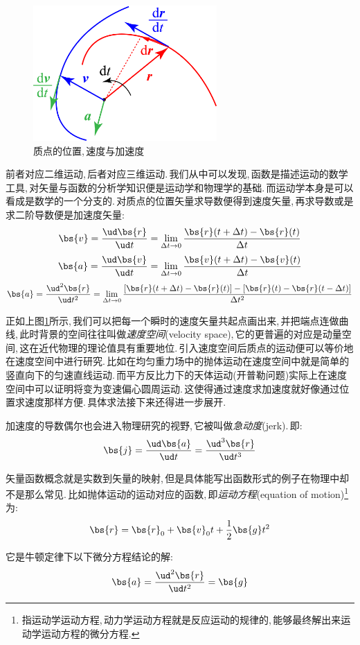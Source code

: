 \begin{figure}\label{6-1-3}
\vspace{-0.4cm}
\centering
\includegraphics[width=7cm]{image/6-1-3.png}
\caption{质点的位置,\,速度与加速度}
\end{figure}
前者对应二维运动,\,后者对应三维运动.\,我们从中可以发现,\,函数是描述运动的数学工具,\,对矢量与函数的分析学知识便是运动学和物理学的基础.\,而运动学本身是可以看成是数学的一个分支的.\,对质点的位置矢量求导数便得到速度矢量,\,再求导数或是求二阶导数便是加速度矢量:
\[\bs{v}=\frac{\ud \bs{r}}{\ud t}=\lim_{\Delta t\to 0 }\frac{\bs{r}(t+\Delta t)-\bs{r}(t)}{\Delta t}\]
\[\bs{a}=\frac{\ud \bs{v}}{\ud t}=\lim_{\Delta t\to 0 }\frac{\bs{v}(t+\Delta t)-\bs{v}(t)}{\Delta t}\]
\[\bs{a}=\frac{\ud ^2\bs{r}}{\ud t^2}=\lim_{\Delta t\to 0 }\frac{[\bs{r}(t+\Delta t)-\bs{r}(t)]-[\bs{r}(t)-\bs{r}(t-\Delta t)]}{\Delta t^2}\]

正如上图\ref{6-1-3}所示,\,我们可以把每一个瞬时的速度矢量共起点画出来,\,并把端点连做曲线,\,此时背景的空间往往叫做\emph{速度空间}(velocity space),\,它的更普遍的对应是动量空间,\,这在近代物理的理论值具有重要地位.\,引入速度空间后质点的运动便可以等价地在速度空间中进行研究.\,比如在均匀重力场中的抛体运动在速度空间中就是简单的竖直向下的匀速直线运动.\,而平方反比力下的天体运动(开普勒问题)实际上在速度空间中可以证明将变为变速偏心圆周运动.\,这使得通过速度求加速度就好像通过位置求速度那样方便.\,具体求法接下来还得进一步展开.

加速度的导数偶尔也会进入物理研究的视野,\,它被叫做\emph{急动度}(jerk).\,即:
\[\bs{j}=\frac{\ud \bs{a}}{\ud t}=\frac{\ud ^3\bs{r}}{\ud t^3}\]

矢量函数概念就是实数到矢量的映射,\,但是具体能写出函数形式的例子在物理中却不是那么常见.\,比如抛体运动的运动对应的函数,\,即\emph{运动方程}(equation of motion)\footnote{指运动学运动方程,\,动力学运动方程就是反应运动的规律的,\,能够最终解出来运动学运动方程的微分方程.}为:
\[\bs{r}=\bs{r}_0+\bs{v}_0 t+\frac{1}{2}\bs{g}t^2\]

它是牛顿定律下以下微分方程结论的解:
\[\bs{a}=\frac{\ud ^2\bs{r}}{\ud t^2}=\bs{g}\]

